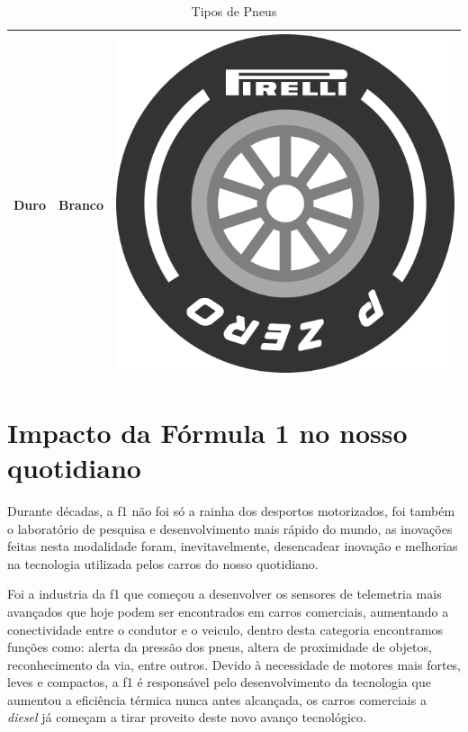 \documentclass{report}
\begin{document}
\begin{table}[!h]
\begin{tabular}{|c|l|l|c|c|}
\multicolumn{3}{|c|}{Duro}     & \cellcolor[HTML]{FFFFFF}Branco                          &  \includegraphics[scale=0.017]{Fotos/Pneus/Pneu_Branco.png} \\ \hline
\end{tabular}
\caption{Tipos de Pneus}
\label{Tipos de Pneus}
\end{table}
\chapter{Impacto da Fórmula 1 no nosso quotidiano}
\label{chap.impactof1}
\hspace{\parindent}Durante décadas, a \ac{f1} não foi só a rainha dos desportos motorizados, foi também o laboratório de pesquisa e desenvolvimento mais rápido do mundo, as inovações feitas nesta modalidade foram, inevitavelmente, desencadear inovação e melhorias na tecnologia utilizada pelos carros do nosso quotidiano.

Foi a industria da \ac{f1} que começou a desenvolver os sensores de telemetria mais avançados que hoje podem ser encontrados em carros comerciais, aumentando a conectividade entre o condutor e o veiculo, dentro desta categoria encontramos funções como: alerta da pressão dos pneus, altera de proximidade de objetos, reconhecimento da via, entre outros. Devido à necessidade de motores mais fortes, leves e compactos, a \ac{f1} é responsável pelo desenvolvimento da tecnologia que aumentou a eficiência térmica nunca antes alcançada, os carros comerciais a \textit{diesel} já começam a tirar proveito deste novo avanço tecnológico.
\end{document}
